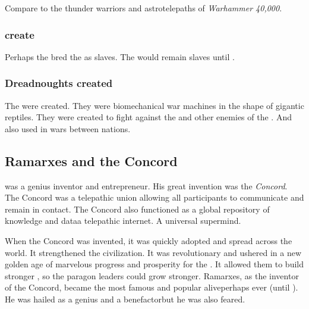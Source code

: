 Compare to the thunder warriors and astrotelepaths of \emph{Warhammer 40,000}. 





\subsubsection{\Ophidians create \nephilim}
Perhaps the \ophidians bred the \nephilim as slaves.
The \nephilim would remain slaves until . 





\subsubsection{Dreadnoughts created}
The  were created. 
They were biomechanical war machines in the shape of gigantic reptiles. 
They were created to fight against the \vorcanths and other enemies of the \ophidians.
And also used in wars between \ophidian nations. 















\subsection{Ramarxes and the Concord}
 was a genius \caisith inventor and entrepreneur. 
His great invention was the \emph{Concord}. 
The Concord was a telepathic union allowing all participants to communicate and remain in contact.
The Concord also functioned as a global repository of knowledge and data\dash a telepathic internet. 
A universal \caisith supermind. 

When the Concord was invented, it was quickly adopted and spread across the world. 
It strengthened the \caisith civilization.
It was revolutionary and ushered in a new golden age of marvelous progress and prosperity for the \caisith. 
It allowed them to build stronger \nexuses, so the paragon leaders could grow stronger. 
Ramarxes, as the inventor of the Concord, became the most famous and popular \caisith alive\dash perhaps ever (until \Sethicus). 
He was hailed as a genius and a benefactor\dash but he was also feared. 





